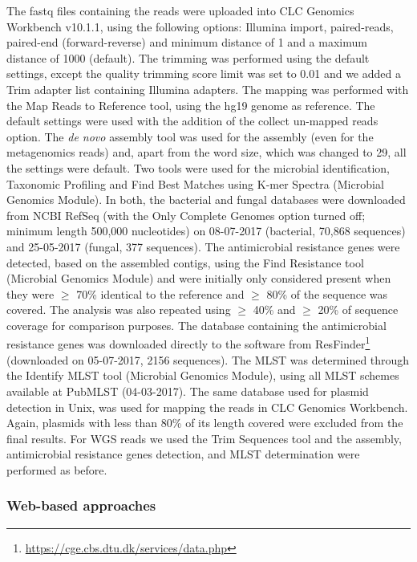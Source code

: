 The fastq files containing the reads were uploaded into CLC Genomics Workbench v10.1.1, using the following options: Illumina import, paired-reads, paired-end (forward-reverse) and minimum distance of 1 and a maximum distance of 1000 (default). 
The trimming was performed using the default settings, except the quality trimming score limit was set to 0.01 and we added a Trim adapter list containing Illumina adapters. 
The mapping was performed with the Map Reads to Reference tool, using the hg19 genome as reference. 
The default settings were used with the addition of the collect un-mapped reads option. The \textit{de novo} assembly tool was used for the assembly (even for the metagenomics reads) and, apart from the word size, which was changed to 29, all the settings were default. 
Two tools were used for the microbial identification, Taxonomic Profiling and Find Best Matches using K-mer Spectra (Microbial Genomics Module). 
In both, the bacterial and fungal databases were downloaded from NCBI RefSeq (with the Only Complete Genomes option turned off; minimum length 500,000 nucleotides) on 08-07-2017 (bacterial, 70,868 sequences) and 25-05-2017 (fungal, 377 sequences). 
The antimicrobial resistance genes were detected, based on the assembled contigs, using the Find Resistance tool (Microbial Genomics Module) and were initially only considered present when they were $\geq$ 70\% identical to the reference and $\geq$ 80\% of the sequence was covered. The analysis was also repeated using $\geq$ 40\% and $\geq$ 20\% of sequence coverage for comparison purposes. 
The database containing the antimicrobial resistance genes was downloaded directly to the software from ResFinder\footnote{\url{https://cge.cbs.dtu.dk/services/data.php}} (downloaded on 05-07-2017, 2156 sequences). The MLST was determined through the Identify MLST tool (Microbial Genomics Module), using all MLST schemes available at PubMLST (04-03-2017). 
The same database used for plasmid detection in Unix, was used for mapping the reads in CLC Genomics Workbench. Again, plasmids with less than 80\% of its length covered were excluded from the final results. 
For WGS reads we used the Trim Sequences tool and the assembly, antimicrobial resistance genes detection, and MLST determination were performed as before.

\subsubsection{Web-based approaches}

